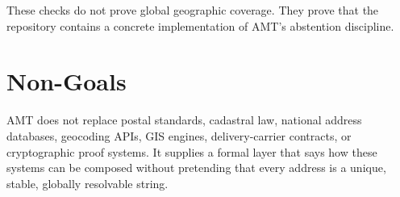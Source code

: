 \documentclass[11pt]{article}
\begin{document}
These checks do not prove global geographic coverage. They prove that the
repository contains a concrete implementation of AMT's abstention discipline.

\section{Non-Goals}

AMT does not replace postal standards, cadastral law, national address
databases, geocoding APIs, GIS engines, delivery-carrier contracts, or
cryptographic proof systems. It supplies a formal layer that says how these
systems can be composed without pretending that every address is a unique,
stable, globally resolvable string.
\end{document}
